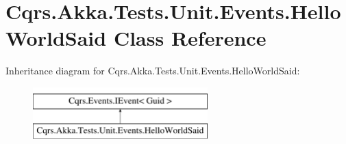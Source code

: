 \hypertarget{classCqrs_1_1Akka_1_1Tests_1_1Unit_1_1Events_1_1HelloWorldSaid}{}\section{Cqrs.\+Akka.\+Tests.\+Unit.\+Events.\+Hello\+World\+Said Class Reference}
\label{classCqrs_1_1Akka_1_1Tests_1_1Unit_1_1Events_1_1HelloWorldSaid}
Inheritance diagram for Cqrs.\+Akka.\+Tests.\+Unit.\+Events.\+Hello\+World\+Said\+:\begin{figure}[H]
\begin{center}
\leavevmode
\includegraphics[height=2.000000cm]{classCqrs_1_1Akka_1_1Tests_1_1Unit_1_1Events_1_1HelloWorldSaid}
\end{center}
\end{figure}
